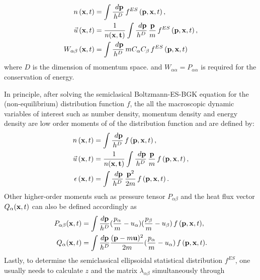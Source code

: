 \documentclass{rsproca}%
\begin{document}
\begin{subequations}
\begin{align}
n\left({\bf x},t\right) &= \int{\frac{\ d{\bf p}}{h^D}}\,f^{ES} \left({\bf p},{\bf x}, t\right), \\
\vec u \left({\bf x},t\right) &= \frac{1}{n(\bf x, t)}\int{\frac{\ d{\bf p}}{h^D}\,\frac{\bf p}{m}}\,f^{ES}\left({\bf p},{\bf x}, t\right), \\
W_{\alpha \beta} \left({\bf x},t\right) &= \int{\frac{\ d{\bf p}}{h^D}\,m C_{\alpha} C_{\beta} \,f^{ES} \left({\bf p},{\bf x}, t\right)}
\end{align}
\end{subequations}
where $D$ is the dimension of momentum space. and $W_{\alpha \alpha} = P_{\alpha \alpha}$ is required for the conservation of energy.

In principle, after solving the semiclasical Boltzmann-ES-BGK equation for the (non-equilibrium) distribution function $f$, the all the macroscopic dynamic variables of interest such as number density, momentum density and energy density are low order moments of of the distribution function and are defined by:
\begin{subequations}
\begin{align}
n\left({\bf x},t\right) &= \int{\frac{\ d{\bf p}}{h^D}}\,f\left({\bf p},{\bf x}, t\right), \\
\vec u \left({\bf x},t\right) &= \frac{1}{n(\bf x, t)}\int{\frac{\ d{\bf p}}{h^D}\,\frac{\bf p}{m}}\,f\left({\bf p},{\bf x}, t\right), \\
{\epsilon}\left({\bf x},t\right) &= \int{\frac{\ d{\bf p}}{h^D}\,\frac{{\bf p}^2}{2m}}\,f\left({\bf p},{\bf x}, t\right).
\end{align}
\end{subequations}
Other higher-order moments such as pressure tensor $P_{\alpha \beta}$ and the heat flux vector $Q_{\alpha}({\bf x},t)$ can also be defined accordingly as
\begin{align}
P_{\alpha \beta}({\bf x},t) &= \int{\frac{d{\bf p}}{h^D}(\frac{p_{\alpha}}{m}-u_{\alpha})(\frac{p_{\beta}}{m}-u_{\beta})\,f\,({\bf p},{\bf x},t)}, \\
Q_{\alpha}({\bf x},t) &= \int{\frac{d{\bf p}}{h^D}\frac{({\bf p}-m{\bf u})^2}{2m}(\frac{p_{\alpha}}{m}-u_{\alpha})\,f\,({\bf p},{\bf x},t)}.
\label{stressflux}
\end{align}
Lastly, to determine the semiclassical ellipsoidal statistical distribution $f^{ES}$, one usually needs to calculate $z$ and the matrix $\lambda_{\alpha \beta}$ simultaneously through
\end{document}
